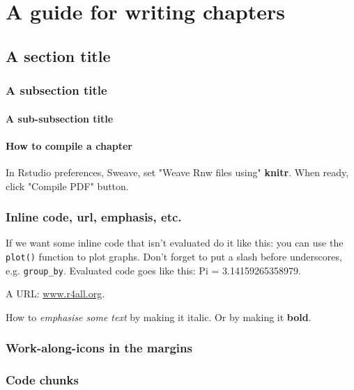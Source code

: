 \documentclass[10pt,a4paper]{book}
\begin{document}


\chapter{A guide for writing chapters}

\section{A section title}

\subsection{A subsection title}

\subsubsection{A sub-subsection title}

\subsubsection{How to compile a chapter}

In Rstudio preferences, Sweave, set "Weave Rnw files using" \textbf{knitr}. When ready, click "Compile PDF" button.

\subsection{Inline code, url, emphasis, etc.}

If we want some inline code that isn't evaluated do it like this: you can use the \texttt{plot()} function to plot graphs. Don't forget to put a slash before underscores, e.g. \texttt{group\_by}. Evaluated code goes like this: Pi = 3.14159265358979.

A URL: \url{www.r4all.org}.

How to \emph{emphasise some text} by making it italic. Or by making it \textbf{bold}.


\subsection{Work-along-icons in the margins}




\subsection{Code chunks}
\end{document}
